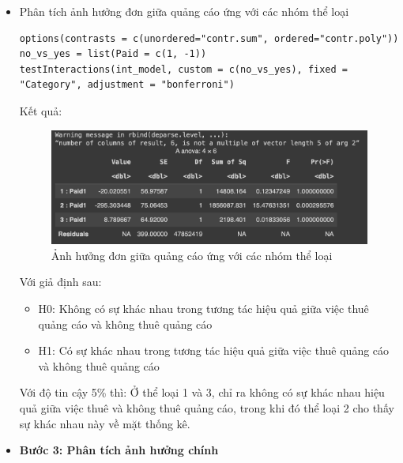 \begin{itemize}
\begin{itemize}
    \item Phân tích ảnh hưởng đơn giữa quảng cáo ứng với các nhóm thể loại
    \begin{lstlisting}
options(contrasts = c(unordered="contr.sum", ordered="contr.poly"))
no_vs_yes = list(Paid = c(1, -1))
testInteractions(int_model, custom = c(no_vs_yes), fixed = "Category", adjustment = "bonferroni")
    \end{lstlisting}
   Kết quả:
   \begin{figure}[H]
       \centering
       \includegraphics[width=0.8\linewidth]{part23_figures/14.png}
       \caption{Ảnh hưởng đơn giữa quảng cáo ứng với các nhóm thể loại}
       \label{fig:Ảnh hưởng đơn giữa quảng cáo ứng với các nhóm thể loại}
   \end{figure}
    Với giả định sau:
        \begin{itemize}
            \item H0: Không có sự khác nhau trong tương tác hiệu quả giữa việc thuê quảng cáo và không thuê quảng cáo
            \item H1: Có sự khác nhau trong tương tác hiệu quả giữa việc thuê quảng cáo và không thuê quảng cáo
        \end{itemize}
    Với độ tin cậy 5\% thì: Ở thể loại 1 và 3, chỉ ra không có sự khác nhau hiệu quả giữa việc thuê và không thuê quảng cáo, trong khi đó thể loại 2 cho thấy sự khác nhau này về mặt thống kê.

    \item \textbf{Bước 3: Phân tích ảnh hưởng chính}


\end{itemize}
\end{itemize}
